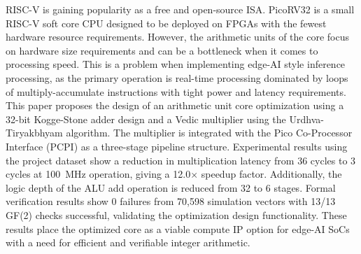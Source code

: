 RISC-V is gaining popularity as a free and open-source ISA. PicoRV32 is a small RISC-V soft core CPU designed to be deployed on FPGAs with the fewest hardware resource requirements. However, the arithmetic units of the core focus on hardware size requirements and can be a bottleneck when it comes to processing speed. This is a problem when implementing edge-AI style inference processing, as the primary operation is real-time processing dominated by loops of multiply-accumulate instructions with tight power and latency requirements. This paper proposes the design of an arithmetic unit core optimization using a 32-bit Kogge-Stone adder design and a Vedic multiplier using the Urdhva-Tiryakbhyam algorithm. The multiplier is integrated with the Pico Co-Processor Interface (PCPI) as a three-stage pipeline structure. Experimental results using the project dataset show a reduction in multiplication latency from 36 cycles to 3 cycles at 100~MHz operation, giving a 12.0$\times$ speedup factor. Additionally, the logic depth of the ALU add operation is reduced from 32 to 6 stages. Formal verification results show 0 failures from 70,598 simulation vectors with 13/13 GF(2) checks successful, validating the optimization design functionality. These results place the optimized core as a viable compute IP option for edge-AI SoCs with a need for efficient and verifiable integer arithmetic.
